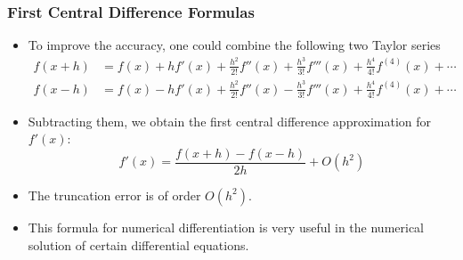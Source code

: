 \documentclass{beamer}
\begin{document}
\begin{frame}[fragile]
\end{frame}

\begin{frame}[fragile]
\frametitle{First Central Difference Formulas}
\begin{itemize}
\item To improve the accuracy, one could combine the following two Taylor series
\begin{align}
f(x+h)&=f(x)+hf'(x)+\frac{h^2}{2!} f''(x)+ \frac{h^3}{3!} f'''(x)+\frac{h^4}{4!} f^{(4)}(x)+\cdots\nonumber\\
f(x-h)&=f(x)-hf'(x)+\frac{h^2}{2!} f''(x)- \frac{h^3}{3!} f'''(x)+\frac{h^4}{4!} f^{(4)}(x)+\cdots\nonumber
\end{align}
\item Subtracting them, we obtain the \alert{first central difference approximation} for $f'(x)$:
\[
f'(x)=\frac{f(x+h)-f(x-h)}{2h}+O(h^2)
\]
\item The truncation error is of order $O(h^2)$. 
\item This formula for numerical differentiation is very useful in the numerical solution of certain differential equations.
\end{itemize}
\end{frame}
\end{document}
